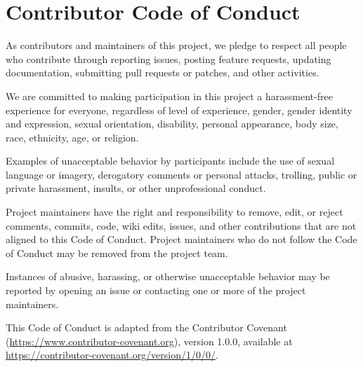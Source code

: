 \hypertarget{contributor-code-of-conduct}{%
\chapter{Contributor Code of Conduct}\label{contributor-code-of-conduct}}

As contributors and maintainers of this project, we pledge to respect all people who
contribute through reporting issues, posting feature requests, updating documentation,
submitting pull requests or patches, and other activities.

We are committed to making participation in this project a harassment-free experience for
everyone, regardless of level of experience, gender, gender identity and expression,
sexual orientation, disability, personal appearance, body size, race, ethnicity, age, or religion.

Examples of unacceptable behavior by participants include the use of sexual language or
imagery, derogatory comments or personal attacks, trolling, public or private harassment,
insults, or other unprofessional conduct.

Project maintainers have the right and responsibility to remove, edit, or reject comments,
commits, code, wiki edits, issues, and other contributions that are not aligned to this
Code of Conduct. Project maintainers who do not follow the Code of Conduct may be removed
from the project team.

Instances of abusive, harassing, or otherwise unacceptable behavior may be reported by
opening an issue or contacting one or more of the project maintainers.

This Code of Conduct is adapted from the Contributor Covenant
(\url{https://www.contributor-covenant.org}), version 1.0.0, available at
\url{https://contributor-covenant.org/version/1/0/0/}.

